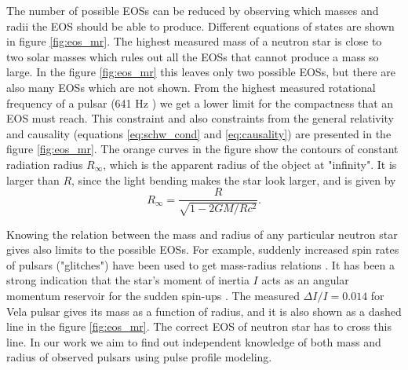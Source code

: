 \documentclass{wihuri}
\def\be{\begin{equation}}
\def\ee{\end{equation}}
\begin{document}
The number of possible EOSs can be reduced by observing which masses and radii the EOS should be able to produce. Different equations of states are shown in figure \ref{fig:eos_mr}. The highest measured mass of a neutron star is close to two solar masses \cite{demorest} which rules out all the EOSs that cannot produce a mass so large. In the figure \ref{fig:eos_mr} this leaves only two possible EOSs, but there are also many EOSs which are not shown. From the highest measured rotational frequency of a pulsar (641 Hz \cite{lattimer}) we get a lower limit for the compactness that an EOS must reach. This constraint and also constraints from the general relativity and causality (equations \ref{eq:schw_cond} and \ref{eq:causality}) are presented in the figure \ref{fig:eos_mr}. The orange curves in the figure show the contours of constant radiation radius $R_{\infty}$, which is the apparent radius of the object at "infinity". It is larger than $R$, since the light bending makes the star look larger, and is given by \cite{lattimer2001}
\be \label{eq:rinfty}
R_{\infty} = \frac{R}{\sqrt{1-2GM/Rc^{2}}}.
\ee  

Knowing the relation between the mass and radius of any particular neutron star gives also limits to the possible EOSs. For example, suddenly increased spin rates of pulsars ("glitches") have been used to get mass-radius relations \cite{lattimer2001}. It has been a strong indication that the star's moment of inertia $I$ acts as an angular momentum reservoir for the sudden spin-ups \cite{link1999}. The measured $\Delta I / I = 0.014$  for Vela pulsar gives its mass as a function of radius, and it is also shown as a dashed line in the figure \ref{fig:eos_mr}. The correct EOS of neutron star has to cross this line. In our work we aim to find out independent knowledge %
of both mass and radius of observed pulsars using pulse profile modeling. 




 
\end{document}
